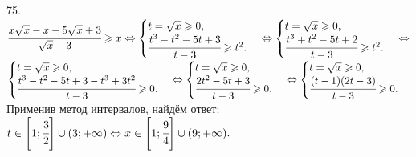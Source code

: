 75. $\cfrac{x\sqrt{x}-x-5\sqrt{x}+3}{\sqrt{x}-3}\geqslant x \Leftrightarrow \begin{cases} t=\sqrt{x}\geqslant0,\\ \cfrac{t^3-t^2-5t+3}{t-3}\geqslant t^2.\end{cases}
\Leftrightarrow \begin{cases} t=\sqrt{x}\geqslant0,\\ \cfrac{t^3+t^2-5t+2}{t-3}\geqslant t^2.\end{cases}
\Leftrightarrow$\\$ \begin{cases} t=\sqrt{x}\geqslant0,\\ \cfrac{t^3-t^2-5t+3-t^3+3t^2}{t-3}\geqslant 0.\end{cases}
\Leftrightarrow \begin{cases} t=\sqrt{x}\geqslant0,\\ \cfrac{2t^2-5t+3}{t-3}\geqslant 0.\end{cases}
\Leftrightarrow \begin{cases} t=\sqrt{x}\geqslant0,\\ \cfrac{(t-1)(2t-3)}{t-3}\geqslant 0.\end{cases}$ Применив метод интервалов, найдём ответ: $t\in\left[1;\cfrac{3}{2}\right]\cup(3;+\infty)\Leftrightarrow x \in\left[1;\cfrac{9}{4}\right]\cup(9;+\infty).$
\begin{figure}[ht!]
\end{figure}\\
